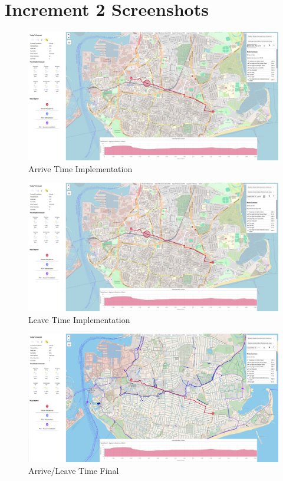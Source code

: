 \chapter{Increment 2 Screenshots}

\begin{figure}[!ht]
    \centering
    \includegraphics[width=425px]{figures/Progress Images/Iteration-2/SR9-10/SR9 - Arrive Time.png}
    \caption{Arrive Time Implementation}
    \label{fig:arrive-time}
\end{figure}

\begin{figure}[!ht]
    \centering
    \includegraphics[width=425px]{figures/Progress Images/Iteration-2/SR9-10/SR9 - Leave Time.png}
    \caption{Leave Time Implementation}
    \label{fig:leave-time}
\end{figure}

\begin{figure}[!ht]
    \centering
    \includegraphics[width=425px]{figures/Progress Images/Iteration-2/SR9-10/SR9_10 - Leave_Arrival Time.png}
    \caption{Arrive/Leave Time Final}
    \label{fig:arrive-leave-time}
\end{figure}

